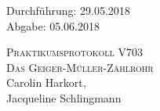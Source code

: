 

\begin{titlepage}
  \begin{flushleft}
 Durchführung: 29.05.2018\\
 Abgabe: 05.06.2018
  \end{flushleft}



 \begin{center}


\textsc{\LARGE Praktikumsprotokoll V703}\\[1.5cm]
\textsc{\huge Das Geiger-Müller-Zählrohr } \\[5,5cm]

Carolin Harkort\footnotemark[1], \\
Jacqueline Schlingmann\footnotemark[2] \\[1,0cm]



 \end{center}

 \vfill

\end{titlepage}


  
  

\nocite{*}
\printbibliography


